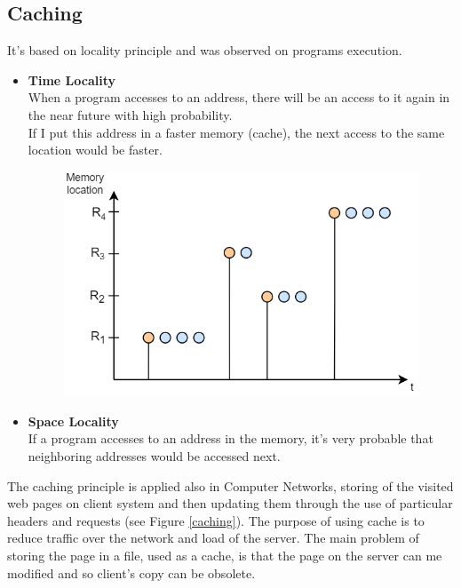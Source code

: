 \subsection{Caching}
It's based on locality principle and was observed on programs execution.
\begin{itemize}
\item{\textbf{Time Locality}\\
When a program accesses to an address, there will be an access to it again in the near future with high probability.\\
If I put this address in a faster memory (cache), the next access to the same location would be faster.
\begin{figure}[h]
\centering
\includegraphics[scale=0.5]{Images/HTTP/time_locality}
\end{figure}
}
\item{\textbf{Space Locality}\\
If a program accesses to an address in the memory, it's very probable that neighboring addresses would be accessed next.}
\end{itemize}
The caching principle is applied also in Computer Networks, storing of the visited web pages on client system and then updating them through the use of particular headers and requests (see Figure \ref{caching}). The purpose of using cache is to reduce traffic over the network and load of the server. The main problem of storing the page in a file, used as a cache, is that the page on the server can me modified and so client's copy can be obsolete.\\
